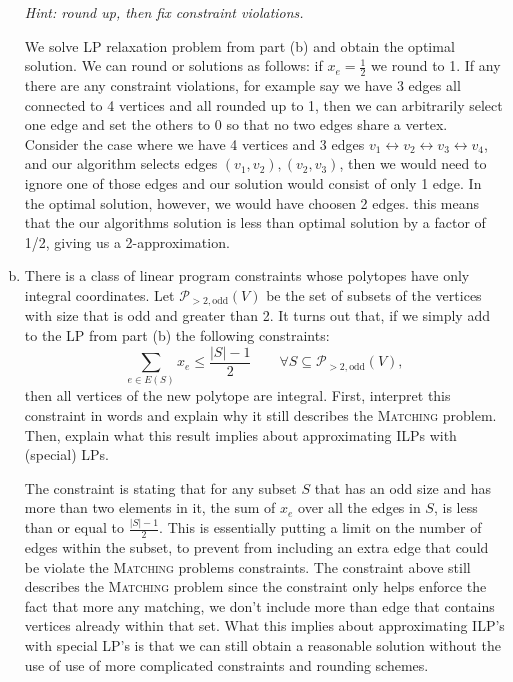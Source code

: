 \documentclass[11pt]{article}
\begin{document}
\begin{enumerate}[(a)]
    \emph{Hint: round up, then fix constraint violations.}\\
    \begin{solution}
        We solve LP relaxation problem from part (b) and obtain the optimal solution. We can round or solutions
        as follows: if $x_e = \frac{1}{2}$ we round to 1. If any there are any constraint violations, for example say we have 3 edges all connected to 4 vertices and all rounded up to 1, then we can 
        arbitrarily select one edge and set the others to 0 so that no two edges share a vertex. Consider the case where we have 4 vertices and 3 edges $v_1 \leftrightarrow v_2 \leftrightarrow v_3 \leftrightarrow v_4$, and our algorithm selects
        edges $(v_1, v_2), (v_2, v_3)$, then we would need to ignore one of those edges and our solution would consist of only 1 edge. In the optimal solution, however, we would have choosen 2 edges.
        this means that the our algorithms solution is less than optimal solution by a factor of 1/2, giving us a 2-approximation.
    \end{solution}
    \item There is a class of linear program constraints whose polytopes have only integral coordinates. Let $\mathcal{P}_{>2,\text{odd}}(V)$ be the set of subsets of the vertices with size that is odd and greater than 2. It turns out that, if we simply add to the LP from part (b) the following constraints:
    \[\sum_{e\in E(S)}x_e\le \frac{|S|-1}{2}\qquad \forall S\subseteq \mathcal{P}_{>2,\text{odd}}(V),\] then all vertices of the new polytope are integral. First, interpret this constraint in words and explain why it still describes the \textsc{Matching} problem. Then, explain what this result implies about approximating ILPs with (special) LPs. \\
    \begin{solution}
        The constraint is stating that for any subset $S$ that has an odd size and has more than two elements in it, the sum of $x_e$ over all the edges in $S$, is less than or equal 
        to $\frac{|S|-1}{2}$. This is essentially putting a limit on the number of edges within the subset, to prevent from including 
        an extra edge that could be violate the \textsc{Matching} problems constraints. The constraint above  still describes
        the \textsc{Matching} problem since the constraint only helps enforce the fact that more any matching, we don't include more than
        edge that contains vertices already within that set. What this implies about approximating ILP's with special LP's is that we can still obtain a reasonable solution without the use of use of more complicated constraints and rounding schemes.


\end{solution}
\end{enumerate}
\end{document}
